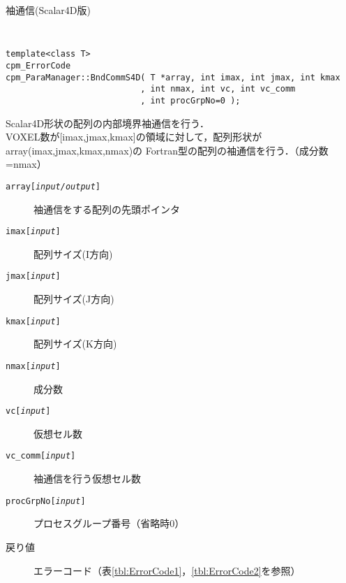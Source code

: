 \begin{spacing}{0.8}
\begin{itembox}[l]{袖通信(Scalar4D版)}
{\tt
\begin{verbatim}
template<class T>
cpm_ErrorCode
cpm_ParaManager::BndCommS4D( T *array, int imax, int jmax, int kmax
                           , int nmax, int vc, int vc_comm
                           , int procGrpNo=0 );
\end{verbatim}
}
Scalar4D形状の配列の内部境界袖通信を行う．\\
VOXEL数が[imax,jmax,kmax]の領域に対して，配列形状がarray(imax,jmax,kmax,nmax)の
Fortran型の配列の袖通信を行う．（成分数=nmax）
\begin{description}
\item[{\tt array[{\it input/output}]}] 袖通信をする配列の先頭ポインタ
\item[{\tt imax[{\it input}]}] 配列サイズ(I方向)
\item[{\tt jmax[{\it input}]}] 配列サイズ(J方向)
\item[{\tt kmax[{\it input}]}] 配列サイズ(K方向)
\item[{\tt nmax[{\it input}]}] 成分数
\item[{\tt vc[{\it input}]}] 仮想セル数
\item[{\tt vc\_comm[{\it input}]}] 袖通信を行う仮想セル数
\item[{\tt procGrpNo[{\it input}]}] プロセスグループ番号（省略時0）
\\
\item[戻り値] エラーコード（表\ref{tbl:ErrorCode1}，\ref{tbl:ErrorCode2}を参照）
\end{description}
\end{itembox}\\
\end{spacing}

